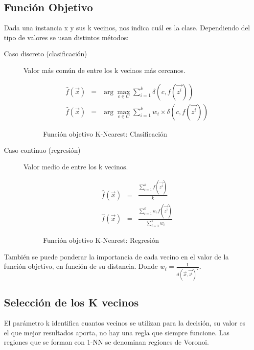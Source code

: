 \documentclass[12pt, twoside, openright]{report} %
\begin{document}
\subsection{Función Objetivo}
Dada una instancia x y sus k vecinos, nos indica cuál es la clase. Dependiendo del tipo de valores se usan distintos métodos:
\begin{description}
	\item[Caso discreto (clasificación)] Valor más común de entre los k vecinos más cercanos.
	      \begin{figure}[H]
		      \begin{eqnarray}
			      \hat{f}(\vec{x}) &=& \arg\max _{c \in C} \sum^k_{i=1} \delta(c,f(\vec{z^i})) \\
			      \hat{f}(\vec{x}) &=& \arg\max _{c \in C} \sum^k_{i=1} w_i \times \delta(c,f(\vec{z^i}))
		      \end{eqnarray}
		      \captionsetup{justification=centering}
		      \caption{Función objetivo K-Nearest: Clasificación}
	      \end{figure}
	\item[Caso continuo (regresión)] Valor medio de entre los k vecinos.
	      \begin{figure}[H]
		      \begin{eqnarray}
			      \hat{f}(\vec{x}) &=& \frac{\sum^k_{i=1} f(\vec{z^i})}{k}\\
			      \hat{f}(\vec{x}) &=& \frac{\sum^k_{i=1} w_i f(\vec{z^i})}{\sum^k_{i=1} w_i}
		      \end{eqnarray}
		      \captionsetup{justification=centering}
		      \caption{Función objetivo K-Nearest: Regresión}
	      \end{figure}
\end{description}
También se puede ponderar la importancia de cada vecino en el valor de la función objetivo, en función de su distancia. Donde $w_i = \frac{1}{d(\vec{x},\vec{z^i})^2}$.

\subsection{Selección de los K vecinos}
El parámetro k identifica cuantos vecinos se utilizan para la decisión, su valor es el que mejor resultados aporta, no hay una regla que siempre funcione. Las regiones que se forman con 1-NN se denominan regiones de Voronoi.
\end{document}
